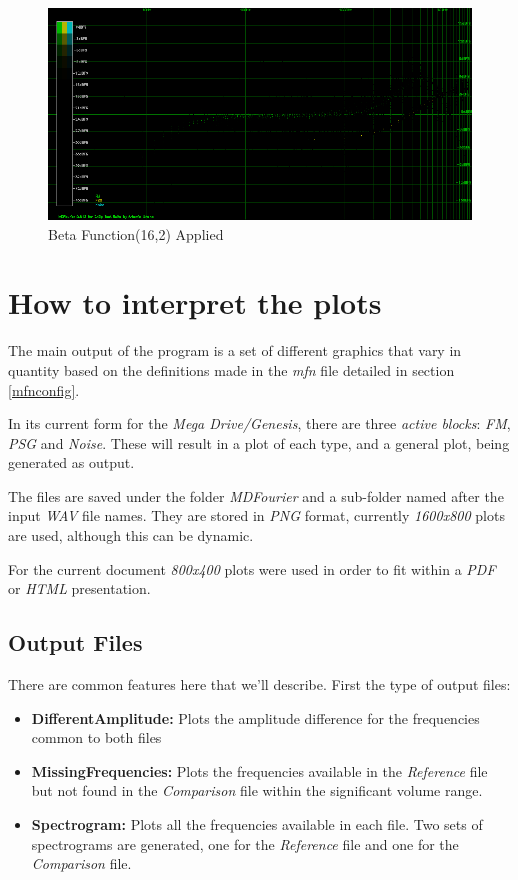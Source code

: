 \documentclass[10pt,a4paper]{report}
\begin{document}
\begin{figure}[H]
	\centering
	\includegraphics[width=1\linewidth]{plots/BetaFunctionPlot_5_Data}
	\caption[Beta Function(16,2)]{Beta Function(16,2) Applied}
	\label{fig:betafunctionplot5data}
\end{figure}

\chapter{How to interpret the plots}
\label{howtoplots}

The main output of the program is a set of different graphics that vary in quantity based on the definitions made in the \textit{mfn} file detailed in section \ref{mfnconfig}.

In its current form for the \textit{Mega Drive/Genesis}, there are three \textit{active blocks}: \textit{FM}, \textit{PSG} and \textit{Noise}. These will result in a plot of each type, and a general plot, being generated as output.

The files are saved under the folder \textit{MDFourier} and a sub-folder named after the input \textit{WAV} file names. They are stored in \textit{PNG}\cite{libpng} format, currently \textit{1600x800} plots are used, although this can be dynamic. 

For the current document \textit{800x400} plots were used in order to fit within a \textit{PDF} or \textit{HTML} presentation.

\section{Output Files}
\label{outputfiles}
There are common features here that we'll describe. First the type of output files: 

\begin{itemize}
	\item \textbf{DifferentAmplitude:} Plots the amplitude difference for the frequencies common to both files
	\item \textbf{MissingFrequencies:} Plots the frequencies available in the \textit{Reference} file but not found in the \textit{Comparison} file within the significant volume range.
	\item \textbf{Spectrogram:} Plots all the frequencies available in each file. Two sets of spectrograms are generated, one for the \textit{Reference} file and one for the \textit{Comparison} file.
\end{itemize}
\end{document}
